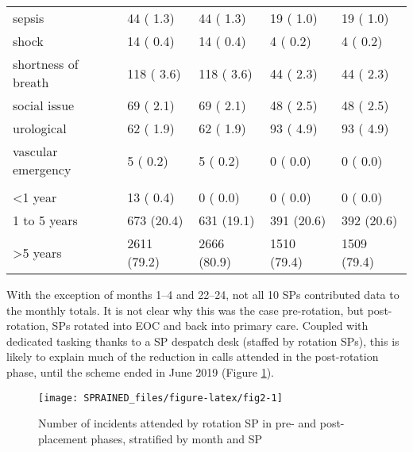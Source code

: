 \documentclass[
  a4paper,
  openany]{article}
\begin{document}
\begin{longtable}[t]{lllll}
\hspace{1em}sepsis & 44 ( 1.3) & 44 ( 1.3) & 19 ( 1.0) & 19 ( 1.0)\\
\rowcolor{gray!6}  \hspace{1em}shock & 14 ( 0.4) & 14 ( 0.4) & 4 ( 0.2) & 4 ( 0.2)\\
\hspace{1em}shortness of breath & 118 ( 3.6) & 118 ( 3.6) & 44 ( 2.3) & 44 ( 2.3)\\
\rowcolor{gray!6}  \hspace{1em}social issue & 69 ( 2.1) & 69 ( 2.1) & 48 ( 2.5) & 48 ( 2.5)\\
\hspace{1em}urological & 62 ( 1.9) & 62 ( 1.9) & 93 ( 4.9) & 93 ( 4.9)\\
\rowcolor{gray!6}  \hspace{1em}vascular emergency & 5 ( 0.2) & 5 ( 0.2) & 0 ( 0.0) & 0 ( 0.0)\\
\addlinespace[0.3em]
\multicolumn{5}{l}{\textbf{Years registered as a paramedic}}\\
\hspace{1em}<1 year & 13 ( 0.4) & 0 ( 0.0) & 0 ( 0.0) & 0 ( 0.0)\\
\rowcolor{gray!6}  \hspace{1em}1 to 5 years & 673 (20.4) & 631 (19.1) & 391 (20.6) & 392 (20.6)\\
\hspace{1em}>5 years & 2611 (79.2) & 2666 (80.9) & 1510 (79.4) & 1509 (79.4)\\*
\end{longtable}

With the exception of months 1--4 and 22--24, not all 10 SPs contributed data to the monthly totals. It is not clear why this was the case pre-rotation, but post-rotation, SPs rotated into EOC and back into primary care. Coupled with dedicated tasking thanks to a SP despatch desk (staffed by rotation SPs), this is likely to explain much of the reduction in calls attended in the post-rotation phase, until the scheme ended in June 2019 (Figure \ref{fig:fig2}).

\begin{figure}

{\centering \texttt{[image: SPRAINED\_files/figure-latex/fig2-1]} 

}

\caption{Number of incidents attended by rotation SP in pre- and post-placement phases, stratified by month and SP}\label{fig:fig2}
\end{figure}
\end{document}
